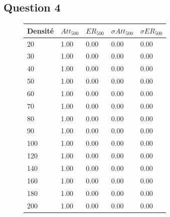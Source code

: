 \documentclass[10pt]{report}
\begin{document}
\subsection{Question 4}

\begin{figure}[H]
\begin{minipage}[b]{0.5\textwidth} \begin{flushleft}
\centering
\begin{tabular}{|l|l|l|l|l|} \hline
  	Densité & $Att_{500}$ & $ER_{500}$ & $\sigma Att_{500}$ & $\sigma ER_{500}$\\ \hline
	20 & 1.00 & 0.00 & 0.00 & 0.00 \\ \hline
  	30 & 1.00 & 0.00 & 0.00 & 0.00 \\ \hline
  	40 & 1.00 & 0.00 & 0.00 & 0.00 \\ \hline
  	50 & 1.00 & 0.00 & 0.00 & 0.00 \\ \hline
  	60 & 1.00 & 0.00 & 0.00 & 0.00 \\ \hline
  	70 & 1.00 & 0.00 & 0.00 & 0.00 \\ \hline
    80 & 1.00 & 0.00 & 0.00 & 0.00 \\ \hline
  	90 & 1.00 & 0.00 & 0.00 & 0.00 \\ \hline
  	100 & 1.00 & 0.00 & 0.00 & 0.00 \\ \hline
  	120 & 1.00 & 0.00 & 0.00 & 0.00 \\ \hline
  	140 & 1.00 & 0.00 & 0.00 & 0.00 \\ \hline
  	160 & 1.00 & 0.00 & 0.00 & 0.00 \\ \hline
  	180 & 1.00 & 0.00 & 0.00 & 0.00 \\ \hline
  	200 & 1.00 & 0.00 & 0.00 & 0.00 \\ \hline
\end{tabular}
\end{flushleft}\end{minipage}
%
\begin{minipage}{0.5\textwidth} \begin{flushright}
\vspace{-7cm}
\centering
{}
\end{flushright}
\end{minipage}
\end{figure}
\end{document}

